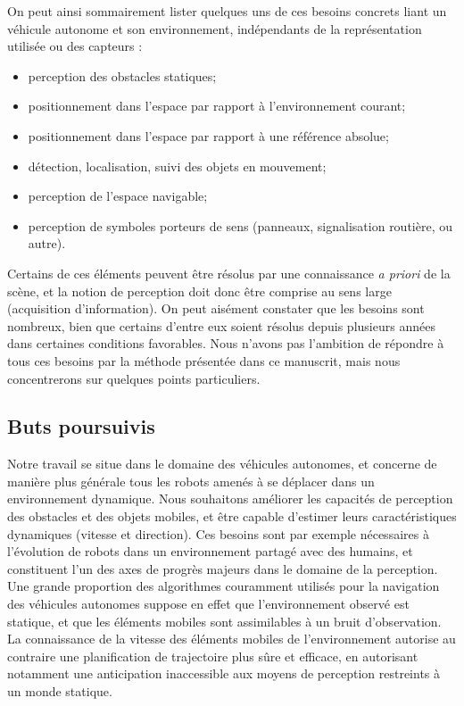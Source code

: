 On peut ainsi sommairement lister quelques uns de ces besoins concrets liant un véhicule autonome et son environnement, indépendants de la représentation utilisée ou des capteurs :
\begin{itemize}
	\item perception des obstacles statiques;
	\item positionnement dans l'espace par rapport à l'environnement courant;
	\item positionnement dans l'espace par rapport à une référence absolue;
	\item détection, localisation, suivi des objets en mouvement;
	\item perception de l'espace navigable;
	\item perception de symboles porteurs de sens (panneaux, signalisation routière, ou autre).\\
\end{itemize}

Certains de ces éléments peuvent être résolus par une connaissance \textit{a priori} de la scène, et la notion de perception doit donc être comprise au sens large (acquisition d'information). On peut aisément constater que les besoins sont nombreux, bien que certains d'entre eux soient résolus depuis plusieurs années dans certaines conditions favorables. Nous n'avons pas l'ambition de répondre à tous ces besoins par la méthode présentée dans ce manuscrit, mais nous concentrerons sur quelques points particuliers.

\subsection{Buts poursuivis}
Notre travail se situe dans le domaine des véhicules autonomes, et concerne de manière plus générale tous les robots amenés à se déplacer dans un environnement dynamique. Nous souhaitons améliorer les capacités de perception des obstacles et des objets mobiles, et être capable d'estimer leurs caractéristiques dynamiques (vitesse et direction). Ces besoins sont par exemple nécessaires à l'évolution de robots dans un environnement partagé avec des humains, et constituent l'un des axes de progrès majeurs dans le domaine de la perception. Une grande proportion des algorithmes couramment utilisés pour la navigation des véhicules autonomes suppose en effet que l'environnement observé est statique, et que les éléments mobiles sont assimilables à un bruit d'observation. La connaissance de la vitesse des éléments mobiles de l'environnement autorise au contraire une planification de trajectoire plus sûre et efficace, en autorisant notamment une anticipation inaccessible aux moyens de perception restreints à un monde statique.\\

